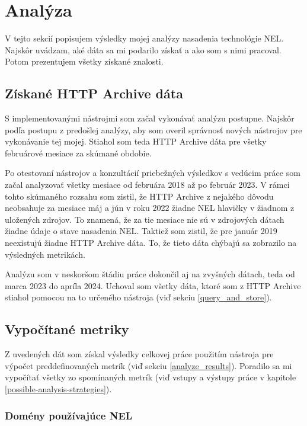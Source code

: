\chapter{Analýza}
\label{analysis-and-its-results}

V tejto sekcií popisujem výsledky mojej analýzy nasadenia technológie NEL. 
Najskôr uvádzam, aké dáta sa mi podarilo získať a ako som s nimi pracoval.
Potom prezentujem všetky získané znalosti.

\section{Získané HTTP Archive dáta}
\label{result-data}

S implementovanými nástrojmi som začal vykonávať analýzu postupne. Najskôr podľa postupu z predošlej analýzy, aby som overil správnosť nových nástrojov pre vykonávanie tej mojej.
Stiahol som teda HTTP Archive dáta pre všetky februárové mesiace za skúmané obdobie.

Po otestovaní nástrojov a konzultácií priebežných výsledkov s vedúcim práce som začal analyzovať všetky mesiace od februára 2018 až po február 2023.
V rámci tohto skúmaného rozsahu som zistil, že HTTP Archive z nejakého dôvodu neobsahuje za mesiace máj a jún v roku 2022 žiadne NEL hlavičky 
v žiadnom z uložených zdrojov. 
To znamená, že za tie mesiace nie sú v zdrojových dátach žiadne údaje o stave nasadenia NEL.
Taktiež som zistil, že pre január 2019 neexistujú žiadne HTTP Archive dáta.
To, že tieto dáta chýbajú sa zobrazilo na výsledných metrikách.

Analýzu som v neskoršom štádiu práce dokončil aj na zvyšných dátach, teda od marca 2023 do apríla 2024.
Uchoval som všetky dáta, ktoré som z HTTP Archive stiahol pomocou na to určeného nástroja (viď sekciu \ref{query_and_store}). 

\section{Vypočítané metriky}

Z uvedených dát som získal výsledky celkovej práce použitím nástroja pre výpočet preddefinovaných metrík (viď sekciu \ref{analyze_results}).
Poradilo sa mi vypočítať všetky zo spomínaných metrík (viď vstupy a výstupy práce v kapitole \ref{possible-analysis-strategies}).

\subsection{Domény používajúce NEL}


